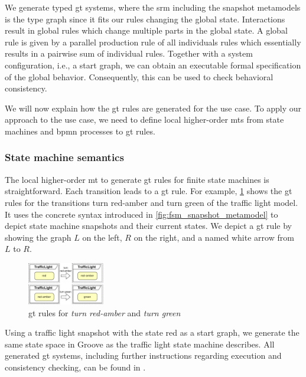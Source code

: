 \documentclass{jot}
\begin{document}
We generate typed \gls*{gt} systems, where the \gls*{srm} including the snapshot metamodels is the type graph since it fits our rules changing the global state.
Interactions result in global rules which change multiple parts in the global state.
A global rule is given by a parallel production rule \cite[Definition 3.2.7]{baldanConcurrentSemanticsAlgebraic1999} of all individuals rules which essentially results in a pairwise sum of individual rules.
Together with a system configuration, i.e., a start graph, we can obtain an executable formal specification of the global behavior.
Consequently, this can be used to check behavioral consistency.

We will now explain how the \gls*{gt} rules are generated for the use case.
To apply our approach to the use case, we need to define local higher-order \gls*{mt}s from state machines and \gls*{bpmn} processes to \gls*{gt} rules.


\subsubsection{State machine semantics}
The local higher-order \gls*{mt} to generate \gls*{gt} rules for finite state machines is straightforward.
Each transition leads to a \gls*{gt} rule.
For example, \cref{fig:sm_rules} shows the \gls*{gt} rules for the transitions \textsf{turn red-amber} and \textsf{turn green} of the traffic light model.
It uses the concrete syntax introduced in \cref{fig:fsm_snapshot_metamodel} to depict state machine snapshots and their current states.
We depict a \gls*{gt} rule by showing the graph $L$ on the left, $R$ on the right, and a named white arrow from $L$ to $R$.

\begin{figure}[h]
    \centering
    \includegraphics[width=0.3\textwidth]{figures/sm_rules.pdf}
    \caption{\gls*{gt} rules for \emph{turn red-amber} and \emph{turn green}}
    \label{fig:sm_rules}
\end{figure}

Using a traffic light snapshot with the state red as a start graph, we generate the same state space in Groove as the traffic light state machine describes.
All generated \gls*{gt} systems, including further instructions regarding execution and consistency checking, can be found in \cite{krauterArtifactsBehavioralConsistency2022}.
\end{document}
